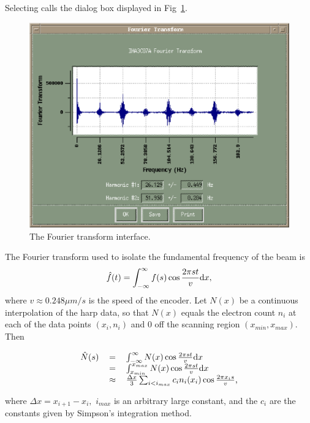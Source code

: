 Selecting  calls the dialog box displayed in Fig~\ref{fig:transform}.
\begin{figure}[htp]
\includegraphics{fourier_transform.ps}
\caption{The Fourier transform interface.}\label{fig:transform}
\end{figure}
The Fourier transform used to isolate the fundamental frequency of the beam is
\begin{equation}
\hat f(t)=\int_{-\infty}^\infty f(s)\cos \frac{2 \pi s t}{v} {\rm d}x,
\end{equation}
where $v\approx 0.248\mu m/s$ is the speed of the encoder.  Let $N(x)$ be a continuous interpolation of
the harp data, so that $N(x)$ equals the electron count $n_i$ at each of the data points $(x_i, n_i)$ and
0 off the scanning region $(x_{min}, x_{max})$. Then
\begin{center}
\begin{equation}
\begin{tabular}{rcl}
$\hat N(s)$&$=$&$\int_{-\infty}^\infty N(x)\cos \frac{2 \pi s t}{v} {\rm d}x$ \\
	   &$=$&$\int_{x_{min}}^{x_{max}} N(x)\cos \frac{2 \pi s t}{v} {\rm d}x $\\
	   &$\approx$&$ \frac{\Delta x}{3}\sum_{i<i_{max}} c_i n_i(x_i) \cos \frac{2 \pi x_i s}{v}$,
\end{tabular}
\end{equation}
\end{center}
where $\Delta x=x_{i+1}-x_i,$ $i_{max}$ is an arbitrary large constant, and the $c_i$ are the constants given
by Simpson's integration method.

